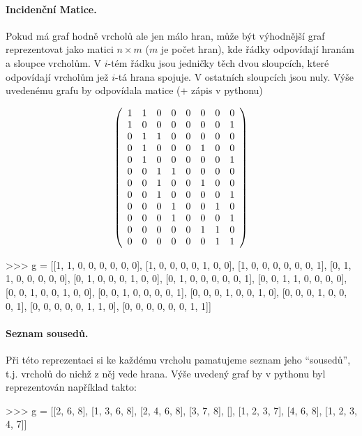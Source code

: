 \paragraph{Incidenční Matice.} Pokud má graf hodně vrcholů ale jen málo hran, může být výhodnější graf reprezentovat jako matici $n\times m$ ($m$ je počet hran), kde řádky
odpovídají hranám a sloupce vrcholům. V $i$-tém řádku jsou jedničky těch dvou sloupcích, které odpovídají vrcholům jež $i$-tá hrana spojuje. V ostatních sloupcích jsou nuly.
Výše uvedenému grafu by odpovídala matice (+ zápis v pythonu)
\begin{center}
\begin{minipage}{5cm}
$$
\left(
\begin{array}{cccccccc}
1 & 1 & 0 & 0 & 0 & 0 & 0 & 0\cr
1 & 0 & 0 & 0 & 0 & 0 & 0 & 1\cr
0 & 1 & 1 & 0 & 0 & 0 & 0 & 0\cr
0 & 1 & 0 & 0 & 0 & 1 & 0 & 0\cr
0 & 1 & 0 & 0 & 0 & 0 & 0 & 1\cr
0 & 0 & 1 & 1 & 0 & 0 & 0 & 0\cr
0 & 0 & 1 & 0 & 0 & 1 & 0 & 0\cr
0 & 0 & 1 & 0 & 0 & 0 & 0 & 1\cr
0 & 0 & 0 & 1 & 0 & 0 & 1 & 0\cr
0 & 0 & 0 & 1 & 0 & 0 & 0 & 1\cr
0 & 0 & 0 & 0 & 0 & 1 & 1 & 0\cr
0 & 0 & 0 & 0 & 0 & 0 & 1 & 1\cr
\end{array}
\right)
$$
\end{minipage}
\hskip2cm
\begin{minipage}{8cm}
\begin{python}
>>> g = [[1, 1, 0, 0, 0, 0, 0, 0],
	 [1, 0, 0, 0, 0, 1, 0, 0],
	 [1, 0, 0, 0, 0, 0, 0, 1],
	 [0, 1, 1, 0, 0, 0, 0, 0],
	 [0, 1, 0, 0, 0, 1, 0, 0],
	 [0, 1, 0, 0, 0, 0, 0, 1],
	 [0, 0, 1, 1, 0, 0, 0, 0],
	 [0, 0, 1, 0, 0, 1, 0, 0],
	 [0, 0, 1, 0, 0, 0, 0, 1],
	 [0, 0, 0, 1, 0, 0, 1, 0],
	 [0, 0, 0, 1, 0, 0, 0, 1],
	 [0, 0, 0, 0, 0, 1, 1, 0],
	 [0, 0, 0, 0, 0, 0, 1, 1]]
\end{python}
\end{minipage}
\end{center}

\paragraph{Seznam sousedů.} Při této reprezentaci si ke každému vrcholu pamatujeme seznam jeho ``sousedů'', t.j. vrcholů do nichž z něj vede hrana.
Výše uvedený graf by v pythonu byl reprezentován například takto:

{
\begin{python}
 >>> g = [[2, 6, 8],
	  [1, 3, 6, 8],
	  [2, 4, 6, 8],
	  [3, 7, 8],
	  [],
	  [1, 2, 3, 7],
	  [4, 6, 8],
	  [1, 2, 3, 4, 7]]
\end{python}
}

